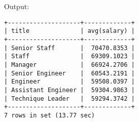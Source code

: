 \documentclass[12pt]{article}
\begin{document}
Output:

\begin{verbatim}
+--------------------+-------------+
| title              | avg(salary) |
+--------------------+-------------+
| Senior Staff       |  70470.8353 |
| Staff              |  69309.1023 |
| Manager            |  66924.2706 |
| Senior Engineer    |  60543.2191 |
| Engineer           |  59508.0397 |
| Assistant Engineer |  59304.9863 |
| Technique Leader   |  59294.3742 |
+--------------------+-------------+
7 rows in set (13.77 sec)
\end{verbatim}

\end{document}
